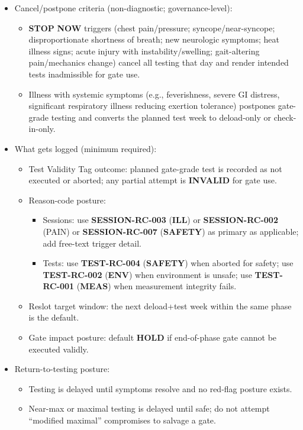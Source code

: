 \documentclass[10pt]{article}
\begin{document}
\begin{itemize}
\item Cancel/postpone criteria (non-diagnostic; governance-level):
\begin{itemize}
\item \textbf{STOP} \textbf{NOW} triggers (chest pain/pressure; syncope/near-syncope; disproportionate shortness of breath; new neurologic symptoms; heat illness signs; acute injury with instability/swelling; gait-altering pain/mechanics change) cancel all testing that day and render intended tests inadmissible for gate use.
\item Illness with systemic symptoms (e.g., feverishness, severe GI distress, significant respiratory illness reducing exertion tolerance) postpones gate-grade testing and converts the planned test week to deload-only or check-in-only.
\end{itemize}

\item What gets logged (minimum required):
\begin{itemize}
\item Test Validity Tag outcome: planned gate-grade test is recorded as not executed or aborted; any partial attempt is \textbf{INVALID} for gate use.
\item Reason-code posture:
\begin{itemize}
\item Sessions: use \textbf{SESSION-RC-003} (\textbf{ILL}) or \textbf{SESSION-RC-002} (PAIN) or \textbf{SESSION-RC-007} (\textbf{SAFETY}) as primary as applicable; add free-text trigger detail.
\item Tests: use \textbf{TEST-RC-004} (\textbf{SAFETY}) when aborted for safety; use \textbf{TEST-RC-002} (\textbf{ENV}) when environment is unsafe; use \textbf{TEST-RC-001} (\textbf{MEAS}) when measurement integrity fails.
\end{itemize}
\item Reslot target window: the next deload+test week within the same phase is the default.
\item Gate impact posture: default \textbf{HOLD} if end-of-phase gate cannot be executed validly.
\end{itemize}

\item Return-to-testing posture:
\begin{itemize}
\item Testing is delayed until symptoms resolve and no red-flag posture exists.
\item Near-max or maximal testing is delayed until safe; do not attempt “modified maximal” compromises to salvage a gate.
\end{itemize}


\end{itemize}
\end{document}
